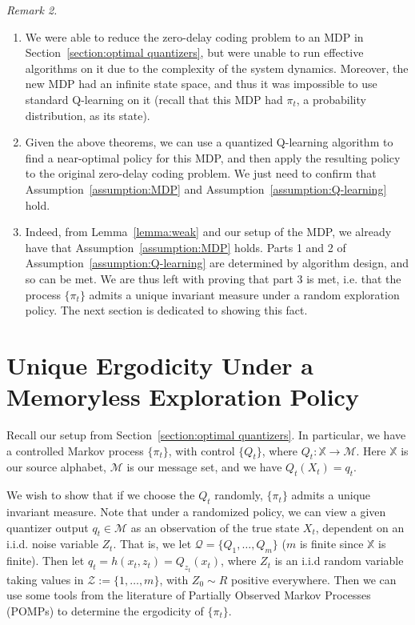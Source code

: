 \documentclass{article}
\begin{document}
\vspace{1em}
\noindent\emph{Remark 2.}\label{remark:2}
\begin{enumerate}
    \item We were able to reduce the zero-delay coding problem to an MDP in Section~\ref{section:optimal quantizers}, but were unable to run effective algorithms on it due to the complexity of the system dynamics. Moreover, the new MDP had an infinite state space, and thus it was impossible to use standard Q-learning on it (recall that this MDP had \(\pi_t\), a probability distribution, as its state).
    \item Given the above theorems, we can use a quantized Q-learning algorithm to find a near-optimal policy for this MDP, and then apply the resulting policy to the original zero-delay coding problem. We just need to confirm that Assumption~\ref{assumption:MDP} and Assumption~\ref{assumption:Q-learning} hold.
    \item Indeed, from Lemma~\ref{lemma:weak} and our setup of the MDP, we already have that Assumption~\ref{assumption:MDP} holds. Parts 1 and 2 of Assumption~\ref{assumption:Q-learning} are determined by algorithm design, and so can be met. We are thus left with proving that part 3 is met, i.e. that the process \(\{\pi_t\}\) admits a unique invariant measure under a random exploration policy. The next section is dedicated to showing this fact.
\end{enumerate}

\section{Unique Ergodicity Under a Memoryless Exploration Policy}\label{section:unique-ergodicity}
Recall our setup from Section~\ref{section:optimal quantizers}. In particular, we have a controlled Markov process \(\{\pi_t\}\), with control \(\{Q_t\}\), where \(Q_t : \mathbb{X} \to \mathcal{M}\). Here \(\mathbb{X}\) is our source alphabet, \(\mathcal{M}\) is our message set, and we have \(Q_t(X_t) = q_t\).

We wish to show that if we choose the \(Q_t\) randomly, \( \{\pi_t\} \) admits a unique invariant measure. Note that under a randomized policy, we can view a given quantizer output \(q_t \in \mathcal{M}\) as an observation of the true state \( X_t \), dependent on an i.i.d. noise variable \( Z_t\). That is, we let \(\mathcal{Q} = \{Q_1,\ldots,Q_m\} \) (\( m \) is finite since \( \mathbb{X} \) is finite). Then let \( q_t = h(x_t,z_t) = Q_{z_t}(x_t) \), where \( Z_t \) is an i.i.d random variable taking values in \( \mathcal{Z} := \{1,\ldots,m\} \), with \(Z_0 \sim R\) positive everywhere. Then we can use some tools from the literature of Partially Observed Markov Processes (POMPs) to determine the ergodicity of \( \{\pi_t\} \).
\end{document}
